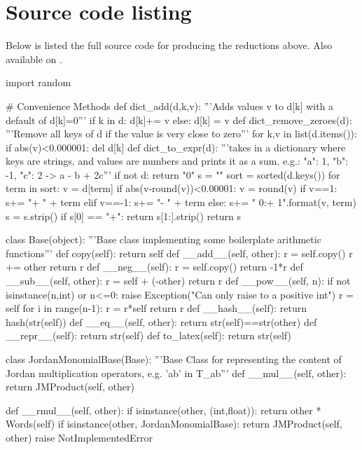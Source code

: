 \documentclass{article}
\begin{document}
\section{Source code listing}
Below is listed the full source code for producing the reductions above. Also available on \cite{sourcecode}.

\begin{python}
import random

# Convenience Methods
def dict_add(d,k,v):
    '''Adds values v to d[k] with a default of d[k]=0'''
    if k in d: d[k]+= v
    else: d[k] = v
def dict_remove_zeroes(d):
    '''Remove all keys of d if the value is very close to zero'''
    for k,v in list(d.items()):
        if abs(v)<0.000001:
            del d[k]
def dict_to_expr(d):
    '''takes in a dictionary where keys are strings,
    and values are numbers and prints it as a sum.
    e.g.: {"a": 1, "b": -1, "c": 2} -> a - b + 2c'''
    if not d:
        return "0"
    s = ""
    sort = sorted(d.keys())
    for term in sort:
        v = d[term]
        if abs(v-round(v))<0.00001:
            v = round(v)
        if v==1: s+= "+ " + term
        elif v==-1: s+= "- " + term
        else: s+= " {0:+} {1}".format(v, term)
    s = s.strip()
    if s[0] == "+": return s[1:].strip()
    return s


class Base(object):
    '''Base class implementing some
    boilerplate arithmetic functions'''
    def copy(self):
        return self
    def __add__(self, other):
        r = self.copy()
        r += other
        return r
    def __neg__(self):
        r = self.copy()
        return -1*r
    def __sub__(self, other):
        r = self + (-other)
        return r
    def __pow__(self, n):
        if not isinstance(n,int) or n<=0:
            raise Exception("Can only raise to a positive int")
        r = self
        for i in range(n-1):
            r = r*self
        return r
    def __hash__(self):
        return hash(str(self))
    def __eq__(self, other):
        return str(self)==str(other)
    def __repr__(self):
        return str(self)
    def to_latex(self):
        return str(self)
    

class JordanMonomialBase(Base):
    '''Base Class for representing the content of
    Jordan multiplication operators, e.g. 'ab' in T_{ab}'''
    def __mul__(self, other):
        return JMProduct(self, other)

    def __rmul__(self, other):
        if isinstance(other, (int,float)):
            return other * Words(self)
        if isinstance(other, JordanMonomialBase):
            return JMProduct(self, other)
        raise NotImplementedError


\end{python}
\end{document}
